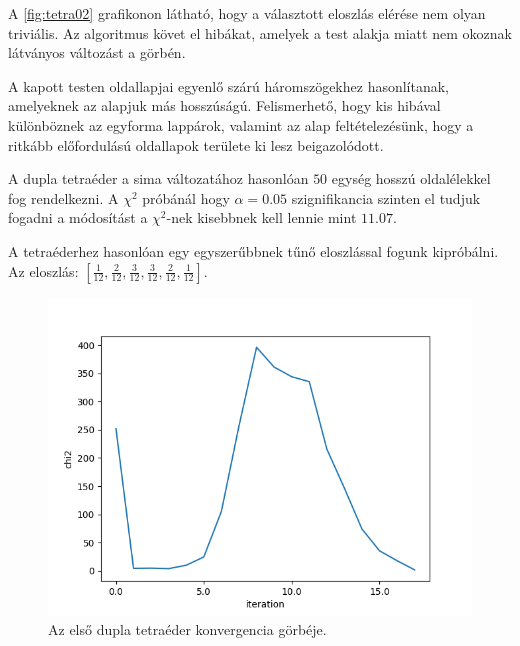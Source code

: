 A \ref{fig:tetra02} grafikonon látható, hogy a választott eloszlás elérése nem olyan triviális.
Az algoritmus követ el hibákat, amelyek a test alakja miatt nem okoznak látványos változást a görbén.

A kapott testen oldallapjai egyenlő szárú háromszögekhez hasonlítanak, amelyeknek az alapjuk más hosszúságú.
Felismerhető, hogy kis hibával különböznek az egyforma lappárok, valamint az alap feltételezésünk, hogy a ritkább előfordulású oldallapok területe ki lesz beigazolódott.

\newpage


A dupla tetraéder a sima változatához hasonlóan $50$ egység hosszú oldalélekkel fog rendelkezni.
A $\chi^2$ próbánál hogy $\alpha = 0.05$ szignifikancia szinten el tudjuk fogadni a módosítást a $\chi^2$-nek kisebbnek kell lennie mint $11.07$.

A tetraéderhez hasonlóan egy egyszerűbbnek tűnő eloszlással fogunk kipróbálni.
Az eloszlás: $[\frac{1}{12}, \frac{2}{12}, \frac{3}{12}, \frac{3}{12}, \frac{2}{12}, \frac{1}{12}]$.

\begin{figure}[h!]
	\centering
	\includegraphics[scale=0.7]{images/doubletetrahedron_01.png}
	\caption{Az első dupla tetraéder konvergencia görbéje.}
	\label{fig:doubletetra01}
\end{figure}

